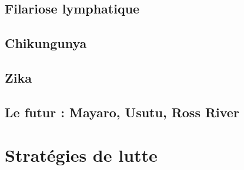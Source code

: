 
\subsection{Filariose lymphatique}

\subsection{Chikungunya}


\subsection{Zika}

\subsection{Le futur : Mayaro, Usutu, Ross River}

\section{Stratégies de lutte}

%
%
